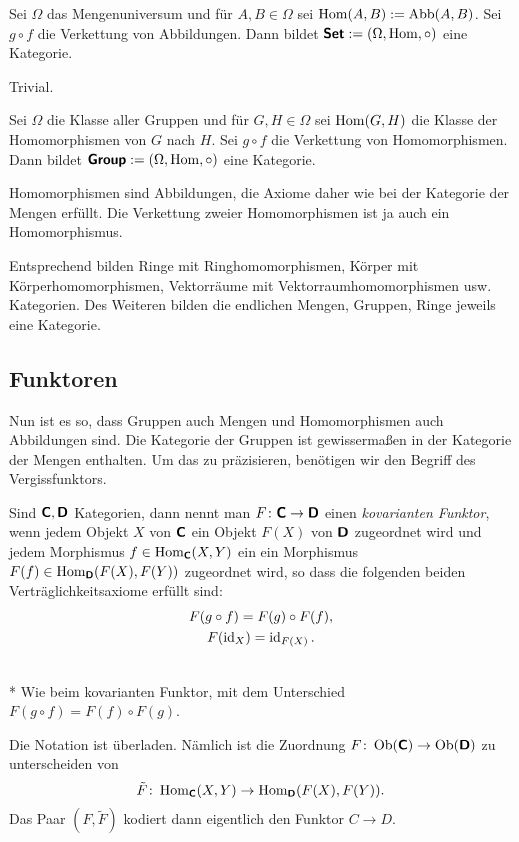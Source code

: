 \begin{Satz}\newlinefirst
Sei $\Omega$ das Mengenuniversum und für $A,B\in\Omega$ sei
$\operatorname{Hom}(A,B):=\operatorname{Abb}(A,B)$. Sei $g\circ f$ die Verkettung
von Abbildungen. Dann bildet $\textsf{\textbf{Set}}:=(\Omega,\operatorname{Hom},\circ)$
eine Kategorie.
\end{Satz}
 Trivial.\;\qedsymbol

\begin{Satz}\newlinefirst
Sei $\Omega$ die Klasse aller Gruppen und für $G,H\in\Omega$ sei
$\operatorname{Hom}(G,H)$ die Klasse der Homomorphismen von $G$ nach $H$.
Sei $g\circ f$ die Verkettung von Homomorphismen.
Dann bildet $\textsf{\textbf{Group}}:=(\Omega,\operatorname{Hom},\circ)$
eine Kategorie.
\end{Satz}
 Homomorphismen sind Abbildungen, die Axiome
daher wie bei der Kategorie der Mengen erfüllt. Die Verkettung
zweier Homomorphismen ist ja auch ein Homomorphismus.\;\qedsymbol

Entsprechend bilden Ringe mit Ringhomomorphismen, Körper mit
Körperhomomorphismen, Vektorräume mit Vektorraumhomomorphismen
usw. Kategorien. Des Weiteren bilden die endlichen Mengen, Gruppen,
Ringe jeweils eine Kategorie.

\subsection{Funktoren}

Nun ist es so, dass Gruppen auch Mengen und Homomorphismen
auch Abbildungen sind. Die Kategorie der Gruppen ist gewissermaßen
in der Kategorie der Mengen enthalten. Um das zu präzisieren,
benötigen wir den Begriff des Vergissfunktors.

\begin{Definition}\newlinefirst
Sind $\textsf{\textbf{C}},\textsf{\textbf{D}}$ Kategorien, dann nennt man
$F\colon\textsf{\textbf{C}}\to\textsf{\textbf{D}}$ einen
\emph{kovarianten Funktor}, wenn jedem Objekt $X$ von $\textsf{\textbf{C}}$ ein Objekt
$F(X)$ von $\textsf{\textbf{D}}$ zugeordnet wird und jedem Morphismus
$f\in\operatorname{Hom}_{\textsf{\textbf{C}}}(X,Y)$ ein ein Morphismus
$F(f)\in\operatorname{Hom}_{\textsf{\textbf{D}}}(F(X),F(Y))$ zugeordnet wird,
so dass die folgenden beiden Verträglichkeitsaxiome erfüllt sind:%
\begin{gather*}
F(g\circ f) = F(g)\circ F(f),\\
F(\operatorname{id}_X) = \operatorname{id}_{F(X)}.
\end{gather*}
\end{Definition}
\begin{Definition}\mbox{}\\*
Wie beim kovarianten Funktor, mit dem Unterschied
$F(g\circ f) = F(f)\circ F(g)$.
\end{Definition}
 Die Notation ist überladen. Nämlich ist die Zuordnung
$F\colon\operatorname{Ob}(\textsf{\textbf{C}})\to\operatorname{Ob}(\textsf{\textbf{D}})$ zu unterscheiden
von
\[\tilde F\colon\operatorname{Hom}_{\textsf{\textbf{C}}}(X,Y)\to\operatorname{Hom}_{\textsf{\textbf{D}}}(F(X),F(Y)).\]
Das Paar $(F,\tilde F)$ kodiert dann eigentlich den Funktor
$C\to D$.

